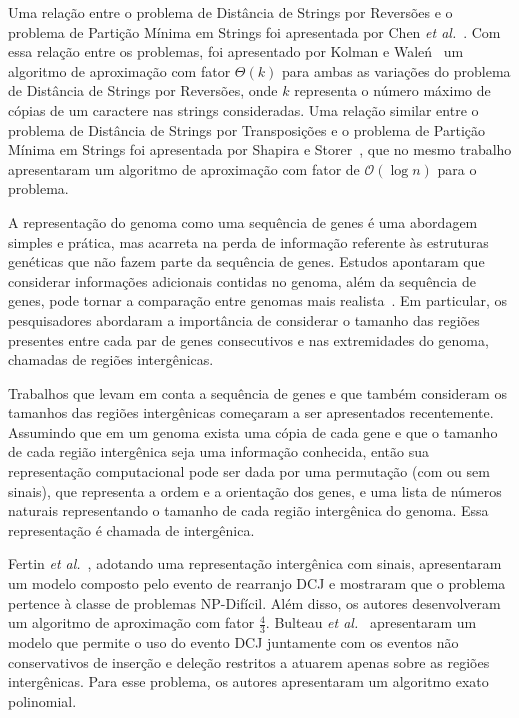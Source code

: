 Uma relação entre o problema de Distância de Strings por Reversões e o problema de Partição Mínima em Strings foi apresentada por Chen \textit{et al.}~\cite{2005-chen-etal}. Com essa relação entre os problemas, foi apresentado por Kolman e Wale{\'n}~\cite{2006-kolman-walen} um algoritmo de aproximação com fator $\Theta(k)$ para ambas as variações do problema de Distância de Strings por Reversões, onde $k$ representa o número máximo de cópias de um caractere nas strings consideradas. Uma relação similar entre o problema de Distância de Strings por Transposições e o problema de Partição Mínima em Strings foi apresentada por Shapira e Storer~\cite{2007-shapira-storer}, que no mesmo trabalho apresentaram um algoritmo de aproximação com fator de $\mathcal{O}(\log n)$ para o problema.

A representação do genoma como uma sequência de genes é uma abordagem simples e prática, mas acarreta na perda de informação referente às estruturas genéticas que não fazem parte da sequência de genes. Estudos apontaram que considerar informações adicionais contidas no genoma, além da sequência de genes, pode tornar a comparação entre genomas mais realista~\cite{2016a-biller-etal, 2016b-biller-etal}. Em particular, os pesquisadores abordaram a importância de considerar o tamanho das regiões presentes entre cada par de genes consecutivos e nas extremidades do genoma, chamadas de regiões intergênicas. 

Trabalhos que levam em conta a sequência de genes e que também consideram os tamanhos das regiões intergênicas começaram a ser apresentados recentemente. Assumindo que em um genoma exista uma cópia de cada gene e que o tamanho de cada região intergênica seja uma informação conhecida, então sua representação computacional pode ser dada por uma permutação (com ou sem sinais), que representa a ordem e a orientação dos genes, e uma lista de números naturais representando o tamanho de cada região intergênica do genoma. Essa representação é chamada de intergênica.

Fertin \textit{et al.}~\cite{2017-fertin-etal}, adotando uma representação intergênica com sinais, apresentaram um modelo composto pelo evento de rearranjo DCJ e mostraram que o problema pertence à classe de problemas NP-Difícil. Além disso, os autores desenvolveram um algoritmo de aproximação com fator $\frac{4}{3}$. Bulteau \textit{et al.}~\cite{2016b-bulteau-etal} apresentaram um modelo que permite o uso do evento DCJ juntamente com os eventos não conservativos de inserção e deleção restritos a atuarem apenas sobre as regiões intergênicas. Para esse problema, os autores apresentaram um algoritmo exato polinomial. 

